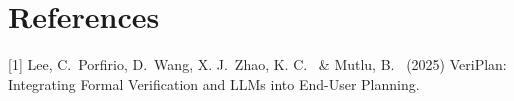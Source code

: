 \documentclass{article}
\begin{document}




\section*{References}




{
\small
% 
[1] Lee, C.\ Porfirio, D.\ Wang, X. J.\ Zhao, K. C. \ \& Mutlu, B. \ (2025) VeriPlan: Integrating Formal Verification and LLMs into End-User Planning. 




}
\end{document}
